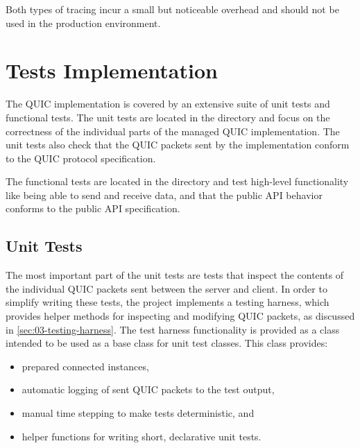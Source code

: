 Both types of tracing incur a small but noticeable overhead and should not be used in the production
environment.

\section{Tests Implementation}

The QUIC implementation is covered by an extensive suite of unit tests and functional tests. The
unit tests are located in the  directory and focus on the
correctness of the individual parts of the managed QUIC implementation. The unit tests also check
that the QUIC packets sent by the implementation conform to the QUIC protocol specification.

The functional tests are located in the
\allowbreak{} directory and test
high-level functionality like being able to send and receive data, and that the public API behavior
conforms to the public API specification.

\subsection{Unit Tests}

The most important part of the unit tests are tests that inspect the contents of the individual QUIC
packets sent between the server and client. In order to simplify writing these tests, the
 project implements a testing harness, which provides helper
methods for inspecting and modifying QUIC packets, as discussed in \autoref{sec:03-testing-harness}.
The test harness functionality is provided as a \ManualTransmissionQuicTestBase{} class intended to
be used as a base class for unit test classes. This class provides:

\begin{itemize}

  \item prepared connected \ManagedQuicConnection{} instances,

  \item automatic logging of sent QUIC packets to the test output,

  \item manual time stepping to make tests deterministic, and

  \item helper functions for writing short, declarative unit tests.

\end{itemize}


